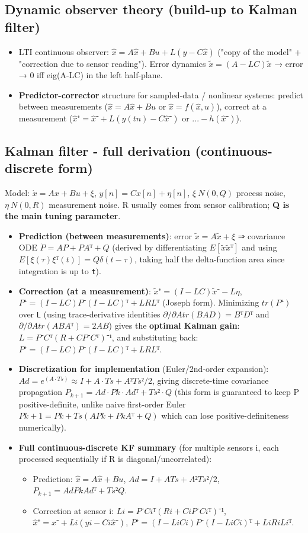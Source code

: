 \documentclass[11pt]{article}
\begin{document}
\subsection{Dynamic observer theory (build-up to Kalman filter)}
\begin{itemize}
\item LTI continuous observer: $\hat{x\dot{}} = A\hat{x}+Bu + L(y-C\hat{x})$ ("copy of the model" + "correction due to sensor reading"). Error dynamics $\tilde{x\dot{}}=(A-LC)\tilde{x}$ → error → 0 iff eig(A-LC) in the left half-plane.
\item \textbf{Predictor-corrector} structure for sampled-data / nonlinear systems: predict between measurements ($\hat{x\dot{}}=A\hat{x}+Bu$ or $\hat{x\dot{}}=f(\hat{x},u)$), correct at a measurement ($\hat{x}⁺ = \hat{x}⁻ + L(y(tn)-C\hat{x}⁻)$ or $...-h(\hat{x}⁻)$).
\end{itemize}

\subsection{Kalman filter - full derivation (continuous-discrete form)}
Model: $\dot{x} = Ax+Bu+ξ$, $y[n]=Cx[n]+η[n]$, $ξ~N(0,Q)$ process noise, $η~N(0,R)$ measurement noise. R usually comes from sensor calibration; \textbf{Q is the main tuning parameter}.

\begin{itemize}
\item \textbf{Prediction (between measurements)}: error $\tilde{x\dot{}} = A\tilde{x}+ξ$ ⇒ covariance ODE $\dot{P} = AP+PAᵀ+Q$ (derived by differentiating $E[\tilde{x}\tilde{x}ᵀ]$ and using $E[ξ(τ)ξᵀ(t)]=Qδ(t-τ)$, taking half the delta-function area since integration is up to \texttt{t}).
\item \textbf{Correction (at a measurement)}: $\tilde{x}⁺ = (I-LC)\tilde{x}⁻ - Lη$, $P⁺ = (I-LC)P⁻(I-LC)ᵀ + LRLᵀ$ (Joseph form). Minimizing $tr(P⁺)$ over \texttt{L} (using trace-derivative identities $∂/∂A tr(BAD)=BᵀDᵀ$ and $∂/∂A tr(ABAᵀ)=2AB$) gives the \textbf{optimal Kalman gain}:
$L  = P⁻Cᵀ(R + CP⁻Cᵀ)⁻¹$, and substituting back: $P⁺ = (I-L C)P⁻(I-L C)ᵀ + L RL ᵀ$.
\item \textbf{Discretization for implementation} (Euler/2nd-order expansion): $Ad = e^(A·Ts) ≈ I + A·Ts + A²Ts²/2$, giving discrete-time covariance propagation $P_{k+1} = Ad·Pk·Adᵀ + Ts²·Q$ (this form is guaranteed to keep P positive-definite, unlike naive first-order Euler $Pk+1 = Pk + Ts(APk+PkAᵀ+Q)$ which can lose positive-definiteness numerically).
\item \textbf{Full continuous-discrete KF summary} (for multiple sensors i, each processed sequentially if R is diagonal/uncorrelated):
\begin{itemize}
\item Prediction: $\hat{x\dot{}}=A\hat{x}+Bu$, $Ad=I+ATs+A²Ts²/2$, $P_{k+1}=AdPkAdᵀ+Ts²Q$.
\item Correction at sensor i: $Li = P⁻Ciᵀ(Ri+CiP⁻Ciᵀ)⁻¹$, $\hat{x}⁺=\hat{x}⁻+Li(yi-Ci\hat{x}⁻)$, $P⁺=(I-LiCi)P⁻(I-LiCi)ᵀ+LiRiLiᵀ$.
\end{itemize}
\end{itemize}
\end{document}
